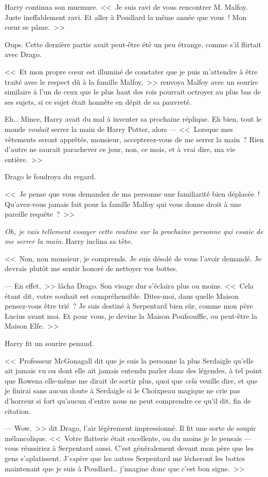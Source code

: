 Harry continua son murmure. <<~Je suis ravi de vous rencontrer M. Malfoy. Juste ineffablement ravi. Et aller à Poudlard la même année que vous~! Mon cœur se pâme.~>>

Oups. Cette dernière partie avait peut-être été un peu étrange, comme s'il flirtait avec Drago.

<<~Et mon propre cœur est illuminé de constater que je puis m'attendre à être traité avec le respect dû à la famille Malfoy,~>> renvoya Malfoy avec un sourire similaire à l'un de ceux que le plus haut des rois pourrait octroyer au plus bas de ses sujets, si ce sujet était honnête en dépit de sa pauvreté.

Eh… Mince, Harry avait du mal à inventer sa prochaine réplique. Eh bien, tout le monde \emph{voulait} serrer la main de Harry Potter, alors — <<~Lorsque mes vêtements seront apprêtés, monsieur, accepterez-vous de me serrer la main~? Rien d'autre ne saurait parachever ce jour, non, ce mois, et à vrai dire, ma vie entière.~>>

Drago le foudroya du regard. 

<<~Je pense que vous demandez de ma personne une familiarité bien déplacée~! Qu'avez-vous jamais fait pour la famille Malfoy qui vous donne droit à une pareille requête~?~>>

\emph{Oh, je vais tellement essayer cette routine sur la prochaine personne qui essaie de me serrer la main}. Harry inclina sa tête. 

<<~Non, non monsieur, je comprends. Je suis désolé de vous l'avoir demandé. Je devrais plutôt me sentir honoré de nettoyer vos bottes.

--- En effet,~>> lâcha Drago. Son visage dur s'éclaira plus ou moins. <<~Cela étant dit, votre souhait est compréhensible. Dites-moi, dans quelle Maison pensez-vous être trié~? Je suis destiné à Serpentard bien sûr, comme mon père Lucius avant moi. Et pour vous, je devine la Maison Poufsouffle, ou peut-être la Maison Elfe.~>>

Harry fit un sourire penaud. 

<<~Professeur McGonagall dit que je suis la personne la plus Serdaigle qu'elle ait jamais vu ou dont elle ait jamais entendu parler dans des légendes, à tel point que Rowena elle-même me dirait de sortir plus, quoi que \emph{cela} veuille dire, et que je finirai sans aucun doute à Serdaigle si le Choixpeau magique ne crie pas d'horreur si fort qu'aucun d'entre nous ne peut comprendre ce qu'il dit, fin de citation.

--- Wow,~>> dit Drago, l'air légèrement impressionné. Il fit une sorte de soupir mélancolique. <<~Votre flatterie était excellente, ou du moins je le pensais — vous réussiriez à Serpentard aussi. C'est généralement devant mon père que les gens s'aplatissent. J'\emph{espère} que les autres Serpentard me lécheront les bottes maintenant que je suis à Poudlard… j'imagine donc que c'est bon signe.~>>

